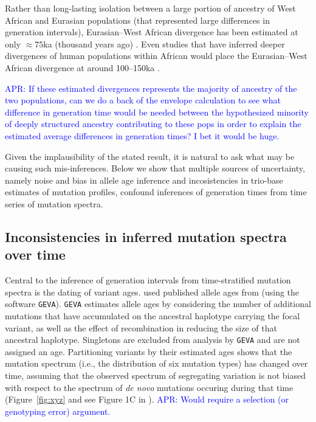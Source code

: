 \documentclass[]{article}
\newcommand{\aprcomment}[1]{{\textcolor{blue}{APR: #1}}}
\newcommand{\GEVA}{\texttt{GEVA}\xspace}
\begin{document}
Rather than long-lasting isolation between a large portion of ancestry of West
African and Eurasian populations (that represented large differences in
generation intervals), Eurasian--West African divergence has been estimated at
only $\approx 75$ka (thousand years ago)
\citep[e.g.,][]{pagani2015tracing,other}. Even studies that have inferred
deeper divergences of human populations within African would place the
Eurasian--West African divergence at around 100--150ka
\citep{schlebusch2017southern}. 

\aprcomment{
    If these estimated divergences represents the majority of ancestry of the
    two populations, can we do a back of the envelope calculation to see what
    difference in generation time would be needed between the hypothesized
    minority of deeply structured ancestry contributing to these pops in order
    to explain the estimated average differences in generation times? I bet it
    would be huge.
}

Given the implausibility of the stated result, it is natural to ask what may be
causing such mis-inferences. Below we show that multiple sources of uncertainty,
namely noise and bias in allele age inference and incosistencies in trio-base
estimates of mutation profiles, confound inferences of generation times from
time series of mutation spectra.

\subsection*{Inconsistencies in inferred mutation spectra over time}

Central to the inference of generation intervals from time-stratified mutation
spectra is the dating of variant ages. \citet{wang2023human} used published
allele ages from \citet{albers2020dating} (using the software \GEVA).
\GEVA estimates allele ages by considering the number of additional
mutations that have accumulated on the ancestral haplotype carrying the focal
variant, as well as the effect of recombination in reducing the size of that
ancestral haplotype. Singletons are excluded from analysis by \GEVA and
are not assigned an age. Partitioning variants by their estimated ages shows
that the mutation spectrum (i.e., the distribution of six mutation types) has
changed over time, assuming that the observed spectrum of segregating variation
is not biased with respect to the spectrum of \emph{de novo} mutations occuring
during that time (Figure~\ref{fig:xyz} and see Figure 1C in
\citeauthor{wang2023human}). \aprcomment{Would require a selection (or
genotyping error) argument.}
\end{document}
